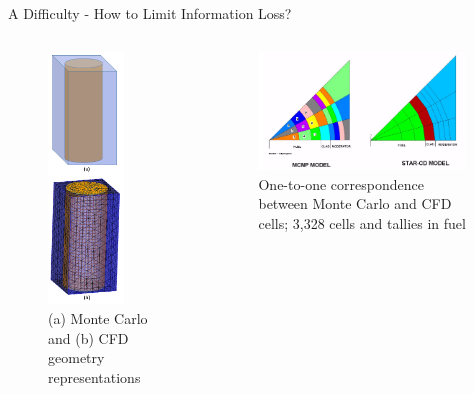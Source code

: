 \documentclass[10pt]{beamer}
\begin{document}
\begin{frame}{A Difficulty - How to Limit Information Loss?}

\begin{columns}
\begin{column}{0.4\linewidth}
\begin{figure}
\includegraphics[width=2cm]{../Figures/MC_vs_CFD_mesh.png}
\caption{(a) Monte Carlo and (b) CFD geometry representations}
\end{figure}
\end{column}
\begin{column}{0.575\linewidth}
\begin{figure}
\includegraphics[width=5.5cm]{../Figures/MCNP_STARCD_meshes.png}
\caption{One-to-one correspondence between Monte Carlo and CFD cells; 3,328 cells and tallies in fuel \cite{cardoni}}
\end{figure}
\end{column}
\end{columns}

\end{frame}

\end{document}
